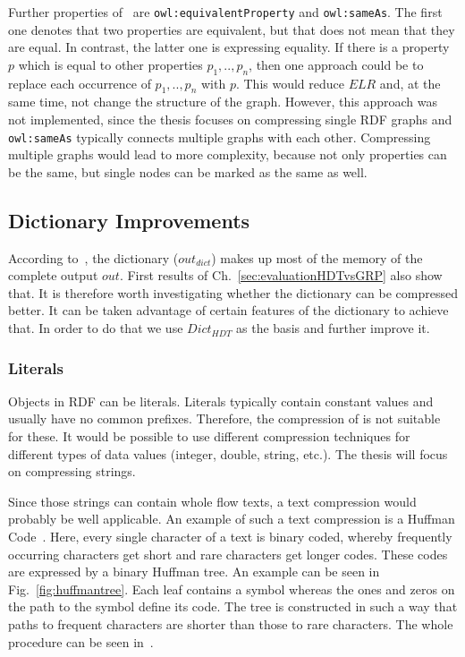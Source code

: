 Further properties of~\cite{owl} are {\tt owl:equivalentProperty} and {\tt owl:sameAs}. The first one denotes that two properties are equivalent, but that does not mean that they are equal. In contrast, the latter one is expressing equality. If there is a property $p$ which is equal to other properties $p_1,..,p_n$, then one approach could be to replace each occurrence of $p_1,..,p_n$ with $p$. This would reduce $ELR$ and, at the same time, not change the structure of the graph. However, this approach was not implemented, since the thesis focuses on compressing single RDF graphs and {\tt owl:sameAs} typically connects multiple graphs with each other. Compressing multiple graphs would lead to more complexity, because not only properties can be the same, but single nodes can be marked as the same as well.

\clearpage
\subsection{Dictionary Improvements}\label{sec:approachDictImprovements}


According to~\cite{hdt}, the dictionary ($out_{dict}$) makes up most of the memory of the complete output $out$. First results of Ch.~\ref{sec:evaluationHDTvsGRP} also show that. It is therefore worth investigating whether the dictionary can be compressed better. It can be taken advantage of certain features of the dictionary to achieve that. In order to do that we use $Dict_{HDT}$ as the basis and further improve it.

\subsubsection{Literals}\label{sec:approachLiterals}

Objects in RDF can be literals. Literals typically contain constant values and usually have no common prefixes. Therefore, the compression of \DHDT{} is not suitable for these. It would be possible to use different compression techniques for different types of data values (integer, double, string, etc.). The thesis will focus on compressing strings.

Since those strings can contain whole flow texts, a text compression would probably be well applicable. An example of such a text compression is a Huffman Code~\cite{huffman}. Here, every single character of a text is binary coded, whereby frequently occurring characters get short and rare characters get longer codes. These codes are expressed by a binary Huffman tree. An example can be seen in Fig.~\ref{fig:huffmantree}. Each leaf contains a symbol whereas the ones and zeros on the path to the symbol define its code. The tree is constructed in such a way that paths to frequent characters are shorter than those to rare characters. The whole procedure can be seen in~\cite{huffman}.

